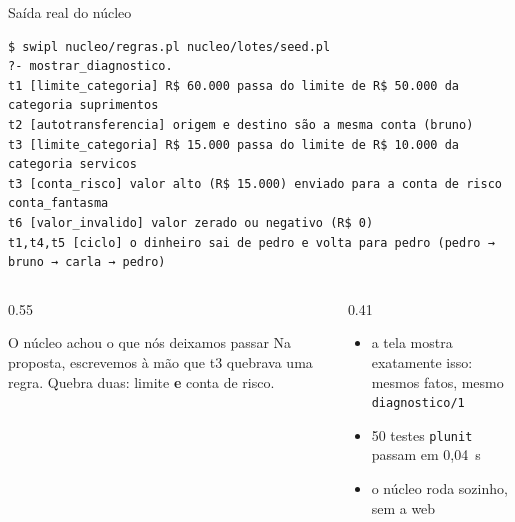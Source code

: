\documentclass[aspectratio=169,11pt,xcolor=table]{beamer}
\begin{document}
\begin{frame}[fragile]{Saída real do núcleo}
\begin{lstlisting}[style=terminal]
$ swipl nucleo/regras.pl nucleo/lotes/seed.pl
?- mostrar_diagnostico.
t1 [limite_categoria] R$ 60.000 passa do limite de R$ 50.000 da categoria suprimentos
t2 [autotransferencia] origem e destino são a mesma conta (bruno)
t3 [limite_categoria] R$ 15.000 passa do limite de R$ 10.000 da categoria servicos
t3 [conta_risco] valor alto (R$ 15.000) enviado para a conta de risco conta_fantasma
t6 [valor_invalido] valor zerado ou negativo (R$ 0)
t1,t4,t5 [ciclo] o dinheiro sai de pedro e volta para pedro (pedro → bruno → carla → pedro)
\end{lstlisting}
  \vspace{6pt}
  \begin{columns}[T]
    \begin{column}{0.55\textwidth}
      \begin{alertblock}{O núcleo achou o que nós deixamos passar}
        \small Na proposta, escrevemos à mão que t3 quebrava uma regra. Quebra
        duas: limite \textbf{e} conta de risco.
      \end{alertblock}
    \end{column}
    \begin{column}{0.41\textwidth}
      \footnotesize
      \begin{itemize}
        \item a tela mostra exatamente isso: mesmos fatos, mesmo \texttt{diagnostico/1}
        \item 50 testes \texttt{plunit} passam em 0,04~s
        \item o núcleo roda sozinho, sem a web
      \end{itemize}
    \end{column}
  \end{columns}
\end{frame}
\end{document}
